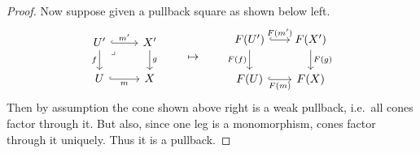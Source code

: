 \documentclass[11pt, oneside, article]{memoir}
\theoremstyle{plain}
\theoremstyle{definition}
\theoremstyle{remark}
\newcommand{\xU}{U}
\newcommand{\xX}{X}
\begin{document}
\begin{proof}
  Now suppose given a pullback square as shown below left.
  \[
    \begin{tikzcd}
      {\xU'} & {\xX'} \\
      \xU & \xX
      \arrow["{m'}", hook, from=1-1, to=1-2]
      \arrow["f"', from=1-1, to=2-1]
      \arrow["\lrcorner"{anchor=center, pos=0.125}, draw=none, from=1-1, to=2-2]
      \arrow["g", from=1-2, to=2-2]
      \arrow["m"', hook, from=2-1, to=2-2]
    \end{tikzcd}
    \qquad\mapsto\qquad
    \begin{tikzcd}[column sep=18pt]
      {F(\xU')} & {F(\xX')} \\
      {F(\xU)} & {F(\xX)}
      \arrow["{F(m')}", hook, from=1-1, to=1-2]
      \arrow["{F(f)}"', from=1-1, to=2-1]
      \arrow["{F(g)}", from=1-2, to=2-2]
      \arrow["{F(m)}"', hook, from=2-1, to=2-2]
    \end{tikzcd}
  \]
  Then by assumption the cone shown above right is a weak pullback,
  i.e.\ all cones factor through it. But also, since one leg is a
  monomorphism, cones factor through it uniquely. Thus it is a pullback.
\end{proof}
\end{document}
